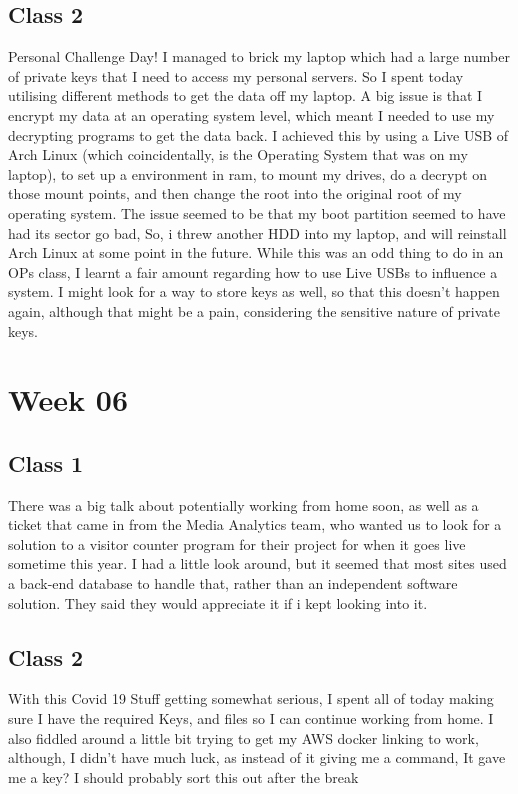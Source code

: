 \documentclass{article}
\begin{document}
\subsection{Class 2}
Personal Challenge Day! I managed to brick my laptop which had a large number of private keys that I need to access my personal servers.
So I spent today utilising different methods to get the data off my laptop. A big issue is that I encrypt my data at an operating system
level, which meant I needed to use my decrypting programs to get the data back. I achieved this by using a Live USB of Arch Linux (which
coincidentally, is the Operating System that was on my laptop), to set up a environment in ram, to mount my drives, do a decrypt on those
mount points, and then change the root into the original root of my operating system. The issue seemed to be that my boot partition seemed
to have had its sector go bad, So, i threw another HDD into my laptop, and will reinstall Arch Linux at some point in the future. While
this was an odd thing to do in an OPs class, I learnt a fair amount regarding how to use Live USBs to influence a system. I might look
for a way to store keys as well, so that this doesn't happen again, although that might be a pain, considering the sensitive nature of private
keys.
\section{Week 06}
\subsection{Class 1}
There was a big talk about potentially working from home soon, as well as a ticket that came in from the Media Analytics team, who
wanted us to look for a solution to a visitor counter program for their project for when it goes live sometime this year. I had a little
look around, but it seemed that most sites used a back-end database to handle that, rather than an independent software solution. They
said they would appreciate it if i kept looking into it.
\subsection{Class 2}
With this Covid 19 Stuff getting somewhat serious, I spent all of today making sure I have the required Keys, and files so I can continue 
working from home. I also fiddled around a little bit trying to get my AWS docker linking to work, although, I didn't have much luck, as 
instead of it giving me a command, It gave me a key? I should probably sort this out after the break
\end{document}

